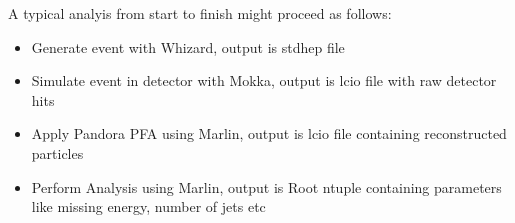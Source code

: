 A typical analyis from start to finish might proceed as follows:
\begin{itemize}
\item Generate event with Whizard, output is stdhep file
\item Simulate event in detector with Mokka, output is lcio file with raw detector hits
\item Apply Pandora PFA using Marlin, output is lcio file containing reconstructed particles
\item Perform Analysis using Marlin, output is Root ntuple containing parameters like missing energy, number of jets etc 
\end{itemize}



